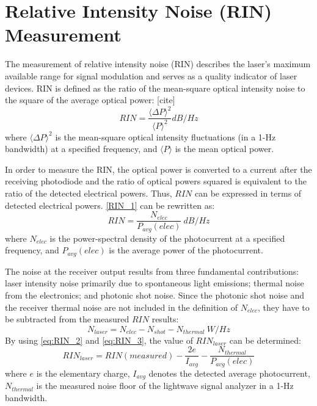 \section{Relative Intensity Noise (RIN) Measurement}\label{sec:RIN_measurement}
The measurement of relative intensity noise (RIN) describes the laser’s maximum available range for signal modulation and serves as a quality indicator of laser devices. RIN is defined as the ratio of the mean-square optical intensity noise to the square of the average optical power: [cite]
\begin{equation}
    RIN=\frac{\langle \Delta P \rangle ^2}{\langle P \rangle ^2}dB/Hz
\label{RIN_1}
\end{equation}
where $\langle \Delta P \rangle ^2$ is the mean-square optical intensity fluctuations (in a 1-Hz bandwidth) at a specified frequency, and $\langle P \rangle$ is the mean optical power.

In order to measure the RIN, the optical power is converted to a current after the receiving photodiode and the ratio of optical powers squared is equivalent to the ratio of the detected electrical powers. Thus, $RIN$ can be expressed in terms of detected electrical powers. \autoref{RIN_1} can be rewritten as:
\begin{equation}
    RIN=\frac{N_{elec}}{P_{avg}(elec)} \ dB/Hz
    \label{eq:RIN_2}
\end{equation}
where $N_{elec}$ is the power-spectral density of the photocurrent at a specified frequency, and $P_{avg}(elec)$ is the average power of the photocurrent.

The noise at the receiver output results from three fundamental contributions: laser intensity noise primarily due to spontaneous light emissions; thermal noise from the electronics; and photonic shot noise. Since the photonic shot noise and the receiver thermal noise are not included in the definition of $N_{elec}$, they have to be subtracted from the measured $RIN$ results:
\begin{equation}
    N_{laser}=N_{elec}-N_{shot}-N_{thermal} \ W/Hz
    \label{eq:RIN_3}
\end{equation}
By using \autoref{eq:RIN_2} and \autoref{eq:RIN_3}, the value of $RIN_{laser}$ can be determined:
\begin{equation}
    RIN_{laser}=RIN(measured)-\frac{2e}{I_{avg}}-\frac{N_{thermal}}{P_{avg}(elec)}
    \label{eq:RIN_4}
\end{equation}
where $e$ is the elementary charge, $I_{avg}$ denotes the detected average photocurrent, $N_{thermal}$ is the measured noise floor of the lightwave signal analyzer in a 1-Hz bandwidth.

